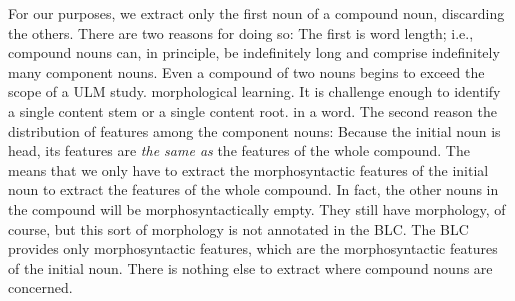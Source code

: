 For our purposes, we extract only the first noun of a compound noun, discarding the others. %
There are two reasons for doing so: %
The first is word length; 
i.e., compound nouns can, in principle, be indefinitely long and comprise
indefinitely many component nouns. 
Even a compound of two nouns begins to exceed the scope of a ULM study. morphological learning. 
It is challenge enough to identify a single content stem or a single content root.  in a word. 
The second reason the distribution 
of features among the component nouns: Because the initial noun is head, its 
features are \emph{the same as} the features of the whole compound. The means that we only 
have to extract the morphosyntactic features of the initial noun to extract the features of the whole 
compound. In fact, the other nouns in the compound will be morphosyntactically empty. They still have
morphology, of course, but this sort of morphology is not annotated in the BLC. The BLC provides only morphosyntactic features, which are the morphosyntactic features of the initial noun. There is nothing else to extract where compound nouns are
concerned. %

% 

